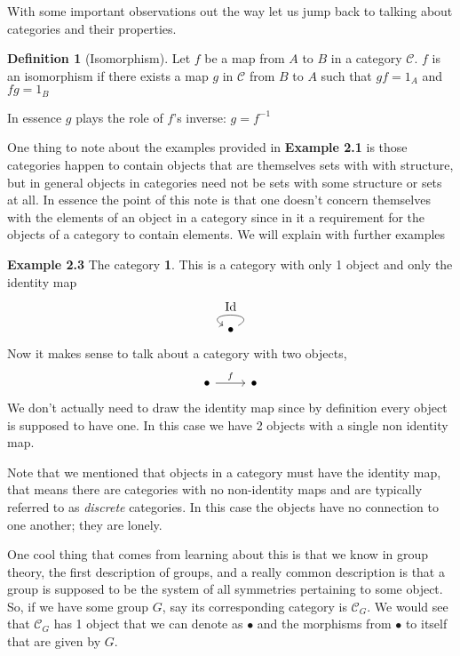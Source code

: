 \documentclass[12pt]{article}
\theoremstyle{definition}
\newtheorem{definition}{Definition}[section]
\theoremstyle{remark}
\begin{document}
    With some important observations out the way let us jump back to talking about categories and their properties. 
    \begin{definition}[Isomorphism]
        Let $f$ be a map from $A$ to $B$ in a category $\mathcal{C}$. $f$ is an isomorphism if there exists a map $g$ in $\mathcal{C}$ from $B$ to $A$ such that $gf = 1_A$ and $fg = 1_B$

        In essence $g$ plays the role of $f$'s inverse: $g = f^{-1}$
    \end{definition}

    One thing to note about the examples provided in \textbf{Example 2.1} is those categories happen to contain objects that are themselves sets with with structure, but in general objects in categories need not be sets with some structure or sets at all. In essence the point of this note is that one doesn't concern themselves with the elements of an object in a category since in it a requirement for the objects of a category to contain elements. We will explain with further examples 

    \textbf{Example 2.3} The category \textbf{1}. This is a category with only 1 object and only the identity map
    \[\begin{tikzpicture}
        \node (a) at (0,0) {$\bullet$};
        \draw[->] (a) to[in=150,out=30,looseness=4.8] node[midway,above] {Id} (a);
        \end{tikzpicture}\]
    Now it makes sense to talk about a category with two objects,
    \[\begin{tikzcd}
        \bullet & \bullet
        \arrow["f",from=1-1,to=1-2]
    \end{tikzcd}\]
    We don't actually need to draw the identity map since by definition every object is supposed to have one. In this case we have 2 objects with a single non identity map.

    Note that we mentioned that objects in a category must have the identity map, that means there are categories with no non-identity maps and are typically referred to as \textit{discrete} categories. In this case the objects have no connection to one another; they are lonely. 

    One cool thing that comes from learning about this is that we know in group theory, the first description of groups, and a really common description is that a group is supposed to be the system of all symmetries pertaining to some object. So, if we have some group $G$, say its corresponding category is $\mathcal{C}_G$. We would see that $\mathcal{C}_G$ has 1 object that we can denote as $\bullet$ and the morphisms from $\bullet$ to itself that are given by $G$. 
\end{document}
